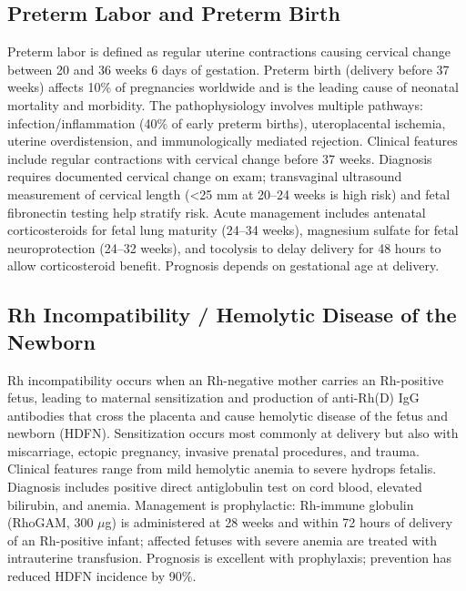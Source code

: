 \subsection{Preterm Labor and Preterm Birth}
\label{sec:Preterm Labor and Preterm Birth}
Preterm labor is defined as regular uterine contractions causing cervical change between 20 and 36 weeks 6 days of gestation. Preterm birth (delivery before 37 weeks) affects 10\% of pregnancies worldwide and is the leading cause of neonatal mortality and morbidity. The pathophysiology involves multiple pathways: infection/inflammation (40\% of early preterm births), uteroplacental ischemia, uterine overdistension, and immunologically mediated rejection. Clinical features include regular contractions with cervical change before 37 weeks. Diagnosis requires documented cervical change on exam; transvaginal ultrasound measurement of cervical length (<25 mm at 20--24 weeks is high risk) and fetal fibronectin testing help stratify risk. Acute management includes antenatal corticosteroids for fetal lung maturity (24--34 weeks), magnesium sulfate for fetal neuroprotection (24--32 weeks), and tocolysis to delay delivery for 48 hours to allow corticosteroid benefit. Prognosis depends on gestational age at delivery.

\subsection{Rh Incompatibility / Hemolytic Disease of the Newborn}
\label{sec:Rh Incompatibility}
Rh incompatibility occurs when an Rh-negative mother carries an Rh-positive fetus, leading to maternal sensitization and production of anti-Rh(D) IgG antibodies that cross the placenta and cause hemolytic disease of the fetus and newborn (HDFN). Sensitization occurs most commonly at delivery but also with miscarriage, ectopic pregnancy, invasive prenatal procedures, and trauma. Clinical features range from mild hemolytic anemia to severe hydrops fetalis. Diagnosis includes positive direct antiglobulin test on cord blood, elevated bilirubin, and anemia. Management is prophylactic: Rh-immune globulin (RhoGAM, 300 $\mu$g) is administered at 28 weeks and within 72 hours of delivery of an Rh-positive infant; affected fetuses with severe anemia are treated with intrauterine transfusion. Prognosis is excellent with prophylaxis; prevention has reduced HDFN incidence by 90\%.

